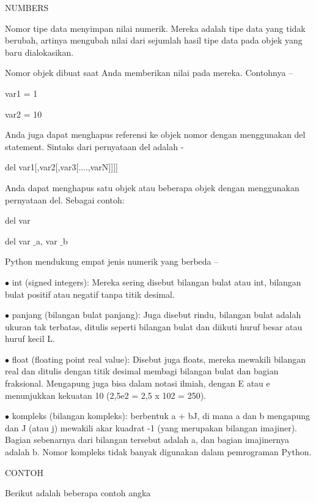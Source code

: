 
NUMBERS \par
\vspace{12pt}
Nomor tipe data menyimpan nilai numerik. Mereka adalah tipe data yang tidak berubah, artinya mengubah nilai dari sejumlah hasil tipe data pada objek yang baru dialokasikan. \par
Nomor objek dibuat saat Anda memberikan nilai pada mereka. Contohnya – \par
\vspace{12pt}
var1 = 1 \par
var2 = 10 \par
Anda juga dapat menghapus referensi ke objek nomor dengan menggunakan del statement. Sintaks dari pernyataan del adalah - \par
\vspace{12pt}
del var1[,var2[,var3[....,varN]]]] \par
Anda dapat menghapus satu objek atau beberapa objek dengan menggunakan pernyataan del. Sebagai contoh: \par
\vspace{12pt}
del var \par
del var $  \_  $a, var $  \_  $b \par
Python mendukung empat jenis numerik yang berbeda – \par
\vspace{12pt}
 $ \bullet $ int (signed integers): Mereka sering disebut bilangan bulat atau int, bilangan bulat positif atau negatif tanpa titik desimal. \par
 $ \bullet $ panjang (bilangan bulat panjang): Juga disebut rindu, bilangan bulat adalah ukuran tak terbatas, ditulis seperti bilangan bulat dan diikuti huruf besar atau huruf kecil L. \par
 $ \bullet $ float (floating point real value): Disebut juga floats, mereka mewakili bilangan real dan ditulis dengan titik desimal membagi bilangan bulat dan bagian fraksional. Mengapung juga bisa dalam notasi ilmiah, dengan E atau e menunjukkan kekuatan 10 (2,5e2 = 2,5 x 102 = 250). \par
 $ \bullet $ kompleks (bilangan kompleks): berbentuk a + bJ, di mana a dan b mengapung dan J (atau j) mewakili akar kuadrat -1 (yang merupakan bilangan imajiner). Bagian sebenarnya dari bilangan tersebut adalah a, dan bagian imajinernya adalah b. Nomor kompleks tidak banyak digunakan dalam pemrograman Python. \par
CONTOH \par
Berikut adalah beberapa contoh angka \par

